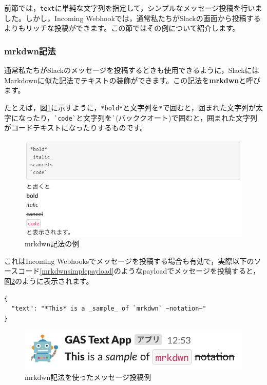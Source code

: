 \documentclass[uplatex,a4j]{jsarticle}
\begin{document}
前節では，\verb|text|に単純な文字列を指定して，シンプルなメッセージ投稿を行いました。しかし，Incoming Webhookでは，通常私たちがSlackの画面から投稿するよりもリッチな投稿ができます。この節ではその例について紹介します。

\subsubsection{mrkdwn記法}


通常私たちがSlackのメッセージを投稿するときも使用できるように，SlackにはMarkdownに似た記法でテキストの装飾ができます。この記法を\textbf{mrkdwn}と呼びます。


たとえば，図\ref{fig:mrkdwn_sample}に示すように，\verb|*bold*|と文字列を\verb|*|で囲むと，囲まれた文字列が太字になったり，\verb|`code`|と文字列を\verb|`|(バッククオート)で囲むと，囲まれた文字列がコードテキストになったりするものです。

\begin{figure}[H]
 \centering
 \includegraphics[keepaspectratio, scale=0.8]{images/mrkdwn_sample.png}
 \caption{mrkdwn記法の例}
 \label{fig:mrkdwn_sample}
\end{figure}

これはIncoming Webhooksでメッセージを投稿する場合も有効で，実際以下のソースコード\ref{mrkdwnsimplepayload}のようなpayloadでメッセージを投稿すると，図\ref{fig:mrkdwn_payload1}のように表示されます。

\begin{lstlisting}[basicstyle=\ttfamily\footnotesize,frame=single,caption=mrkdwn payload sample,label=mrkdwnsimplepayload]
{
  "text": "*This* is a _sample_ of `mrkdwn` ~notation~"
}
\end{lstlisting}

\begin{figure}[H]
 \centering
 \includegraphics[keepaspectratio, scale=0.8]{images/mrkdwn_payload1.png}
 \caption{mrkdwn記法を使ったメッセージ投稿例}
 \label{fig:mrkdwn_payload1}
\end{figure}
\end{document}
